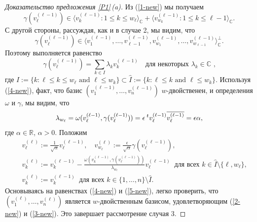 \documentclass{amsart}
\theoremstyle{definition}
\begin{document}
\begin{proof}[Доказательство предложения \ref{P1}\,{\rm (a)}]
Из (\ref{1-new}) мы получаем
\[\gamma(v_\ell^{(\ell-1)})\in
\langle v_k^{(\ell-1)}:1\leq k\leq w_\ell\rangle_\mathbb{C}+\langle v_{w_k}^{(\ell-1)}:1\leq k\leq \ell-1\rangle_\mathbb{C}.
\]
С другой стороны, рассуждая, как и в случае 2, мы видим, что
\[\gamma(v_\ell^{(\ell-1)})\in\langle v_1^{(\ell-1)},\ldots,v_{\ell-1}^{(\ell-1)},v_{w_1}^{(\ell-1)},\ldots,v_{w_{\ell-1}}^{(\ell-1)}\rangle_\mathbb{C}^\perp.\]
Поэтому выполняется равенство
\begin{equation}
\label{4-new}
\gamma(v_\ell^{(\ell-1)})=\sum_{k\in I}\lambda_kv_k^{(\ell-1)}
\quad\mbox{для некоторых $\lambda_k\in\mathbb{C}$ ,}
\end{equation}
где $I:=\{k:\ell\leq k\leq w_\ell\mbox{ and }\ell\leq w_k\}\subset\hat{I}:=\{k:\ell\leq k\mbox{ and }\ell\leq w_k\}$.
Используя (\ref{4-new}), факт, что базис $(v_1^{(\ell-1)},\ldots,v_n^{(\ell-1)})$  $w$-двойственен, и определения $\omega$ и $\gamma$, мы видим, что
\begin{equation}
\label{5-new}
\lambda_{w_\ell}=\omega(v_\ell^{(\ell-1)},\gamma(v_\ell^{(\ell-1)}))=\epsilon \mbox{\:}^tv_\ell^{(\ell-1)}\overline{v_\ell^{(\ell-1)}}=\epsilon\alpha,
\end{equation}
где $\alpha\in\mathbb{R}$, $\alpha>0$.
Положим
\begin{eqnarray*}
 && v_\ell^{(\ell)}:=\frac{1}{\sqrt{\alpha}}v_\ell^{(\ell-1)},\quad
v_{w_\ell}^{(\ell)}:=\frac{\epsilon}{\sqrt{\alpha}}\gamma(v_\ell^{(\ell-1)}),\\
 && v_k^{(\ell)}:=v_k^{(\ell-1)}-\frac{\omega(v_k^{(\ell-1)},\gamma(v_\ell^{(\ell-1)}))}{\lambda_{w_\ell}}v_\ell^{(\ell-1)}\ \mbox{ для всех $k\in \hat{I}\setminus\{\ell,w_\ell\}$}, \\
&& v_k^{(\ell)}:=v_k^{(\ell-1)}\ \mbox{ для всех $k\in\{1,\ldots,n\}\setminus \hat{I}$.}
\end{eqnarray*}
Основываясь на равенствах (\ref{4-new}) и (\ref{5-new}), легко проверить, что $(v_1^{(\ell)},\ldots,v_n^{(\ell)})$ является  $w$-двойственным базисом,  удовлетворяющим (\ref{2-new}) и (\ref{3-new}).
Это завершает рассмотрение случая 3.
\end{proof}
\end{document}
